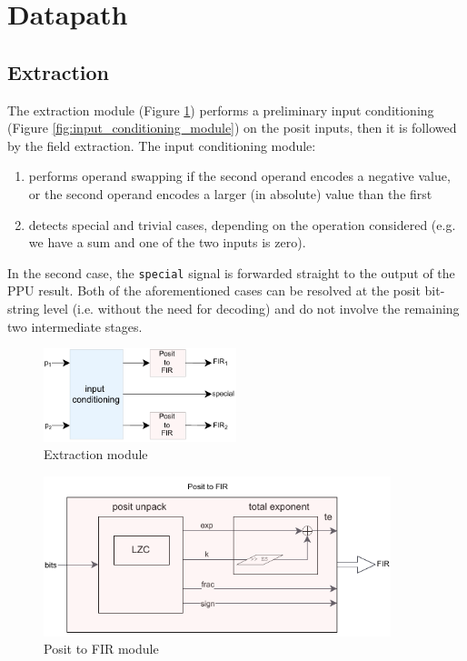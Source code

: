 \section{Datapath}

\subsection{Extraction}\label{sec:posit_extraction}

The extraction module (Figure \ref{fig:extraction_ppu}) performs a preliminary input conditioning (Figure \ref{fig:input_conditioning_module}) on the posit inputs, then it is followed by the field extraction.
The input conditioning module:
\begin{enumerate}
    \item performs operand swapping if the second operand encodes a negative value, or the second operand encodes a larger (in absolute) value than the first 
    \item detects special and trivial cases, depending on the operation considered (e.g. we have a sum and one of the two inputs is zero).
\end{enumerate} 
In the second case, the \texttt{special} signal is forwarded straight to the output of the PPU result.  Both of the aforementioned cases can be resolved at the posit bit-string level (i.e. without the need for decoding) and do not involve the remaining two intermediate stages.
\begin{figure}
    \centering
    \includegraphics[width=0.5\textwidth]{figures/extraction.drawio.pdf}
    \caption{Extraction module}
    \label{fig:extraction_ppu}
\end{figure}
\begin{figure}
    \centering
    \includegraphics[width=0.9\textwidth]{figures/posit2fir.drawio.pdf}
    \caption{Posit to FIR module}
    \label{fig:posit2fir_ppu}
\end{figure}
